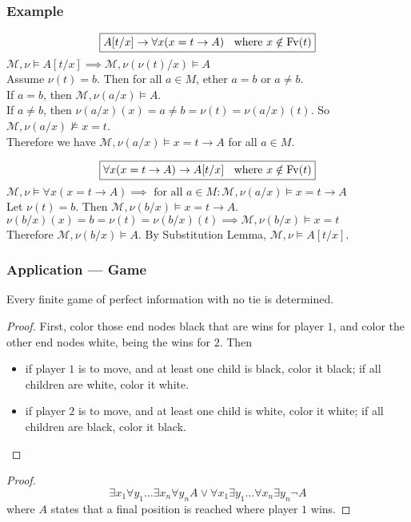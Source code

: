 \documentclass[UTF8,aspectratio=43,11pt,colorlinks,compress,openany]{beamer}%
\begin{document}
\begin{frame}\frametitle{Example}
\[\fbox{$A[t/x]\to\forall x(x=t\to A)\;\; \mbox{ where } x\notin\operatorname{Fv}(t)$}\]
$\mathcal{M},\nu\vDash A[t/x]\implies\mathcal{M},\nu(\nu(t)/x)\vDash A$\\
Assume $\nu(t)=b$. Then for all $a\in M$, ether $a=b$ or $a\ne b$.\\
If $a=b$, then $\mathcal{M},\nu(a/x)\vDash A$.\\
If $a\ne b$, then $\nu(a/x)(x)=a\ne b=\nu(t)=\nu(a/x)(t)$. So $\mathcal{M},\nu(a/x)\nvDash x=t$.\\
Therefore we have $\mathcal{M},\nu(a/x)\vDash x=t\to A$ for all $a\in M$.

\[\fbox{$\forall x(x=t\to A)\to A[t/x]\;\; \mbox{ where } x\notin\operatorname{Fv}(t)$}\]
$\mathcal{M},\nu\vDash\forall x(x=t\to A)\implies \mbox{ for all } a\in M: \mathcal{M},\nu(a/x)\vDash x=t\to A$\\
Let $\nu(t)=b$. Then $\mathcal{M},\nu(b/x)\vDash x=t\to A$.\\
$\nu(b/x)(x)=b=\nu(t)=\nu(b/x)(t)\implies\mathcal{M},\nu(b/x)\vDash x=t$\\
Therefore $\mathcal{M},\nu(b/x)\vDash A$. By Substitution Lemma, $\mathcal{M},\nu\vDash A[t/x]$.
\end{frame}

\begin{frame}\frametitle{Application --- Game}
	\begin{theorem}
		Every finite game of perfect information with no tie is determined.
	\end{theorem}
	\begin{proof}
		First, color those end nodes black that are wins for player $1$, and color the other end nodes white, being the wins for $2$. Then
		\begin{itemize}
			\item if player $1$ is to move, and at least one child is black, color it black; if all children are white, color it white.
			\item if player $2$ is to move, and at least one child is white, color it white; if all children are black, color it black.
		\end{itemize}
	\end{proof}
	\begin{proof}
		\[\exists x_1\forall y_1\dots\exists x_n\forall y_n A\vee\forall x_1\exists y_1\dots\forall x_n\exists y_n\neg A\]
		where $A$ states that a final position is reached where player $1$ wins.
	\end{proof}
\end{frame}
\end{document}
